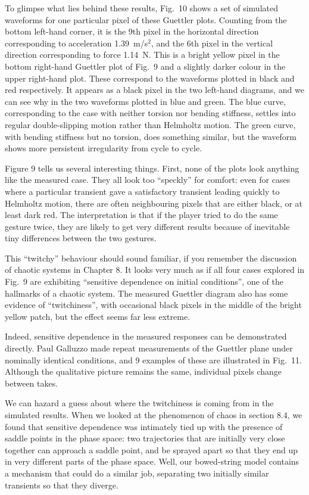   To glimpse what lies behind these results, Fig.\ 10 shows a set of simulated 
  waveforms for one particular pixel of these Guettler plots. Counting from the 
  bottom left-hand corner, it is the 9th pixel in the horizontal direction 
  corresponding to acceleration 1.39~m/s$^2$, and the 6th pixel in the vertical 
  direction corresponding to force 1.14~N. This is a bright yellow pixel in the 
  bottom right-hand Guettler plot of Fig.\ 9 and a slightly darker colour in 
  the upper right-hand plot. These correspond to the waveforms plotted in black 
  and red respectively. It appears as a black pixel in the two left-hand 
  diagrams, and we can see why in the two waveforms plotted in blue and green. 
  The blue curve, corresponding to the case with neither torsion nor bending 
  stiffness, settles into regular double-slipping motion rather than Helmholtz 
  motion. The green curve, with bending stiffness but no torsion, does 
  something similar, but the waveform shows more persistent irregularity from 
  cycle to cycle. 

  Figure 9 tells us several interesting things. First, none of the plots look 
  anything like the measured case. They all look too “speckly” for comfort: 
  even for cases where a particular transient gave a satisfactory transient 
  leading quickly to Helmholtz motion, there are often neighbouring pixels that 
  are either black, or at least dark red. The interpretation is that if the 
  player tried to do the same gesture twice, they are likely to get very 
  different results because of inevitable tiny differences between the two 
  gestures. 

  This “twitchy” behaviour should sound familiar, if you remember the 
  discussion of chaotic systems in Chapter 8. It looks very much as if all four 
  cases explored in Fig.\ 9 are exhibiting “sensitive dependence on initial 
  conditions”, one of the hallmarks of a chaotic system. The measured Guettler 
  diagram also has some evidence of “twitchiness”, with occasional black pixels 
  in the middle of the bright yellow patch, but the effect seems far less 
  extreme. 

  Indeed, sensitive dependence in the measured responses can be demonstrated 
  directly. Paul Galluzzo made repeat measurements of the Guettler plane under 
  nominally identical conditions, and 9 examples of these are illustrated in 
  Fig.\ 11. Although the qualitative picture remains the same, individual 
  pixels change between takes. 

  We can hazard a guess about where the twitchiness is coming from in the 
  simulated results. When we looked at the phenomenon of chaos in section 8.4, 
  we found that sensitive dependence was intimately tied up with the presence 
  of saddle points in the phase space: two trajectories that are initially very 
  close together can approach a saddle point, and be sprayed apart so that they 
  end up in very different parts of the phase space. Well, our bowed-string 
  model contains a mechanism that could do a similar job, separating two 
  initially similar transients so that they diverge. 

